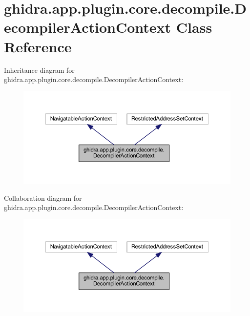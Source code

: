 \hypertarget{classghidra_1_1app_1_1plugin_1_1core_1_1decompile_1_1_decompiler_action_context}{}\section{ghidra.\+app.\+plugin.\+core.\+decompile.\+Decompiler\+Action\+Context Class Reference}
\label{classghidra_1_1app_1_1plugin_1_1core_1_1decompile_1_1_decompiler_action_context}


Inheritance diagram for ghidra.\+app.\+plugin.\+core.\+decompile.\+Decompiler\+Action\+Context\+:
\nopagebreak
\begin{figure}[H]
\begin{center}
\leavevmode
\includegraphics[width=350pt]{classghidra_1_1app_1_1plugin_1_1core_1_1decompile_1_1_decompiler_action_context__inherit__graph}
\end{center}
\end{figure}


Collaboration diagram for ghidra.\+app.\+plugin.\+core.\+decompile.\+Decompiler\+Action\+Context\+:
\nopagebreak
\begin{figure}[H]
\begin{center}
\leavevmode
\includegraphics[width=350pt]{classghidra_1_1app_1_1plugin_1_1core_1_1decompile_1_1_decompiler_action_context__coll__graph}
\end{center}
\end{figure}
